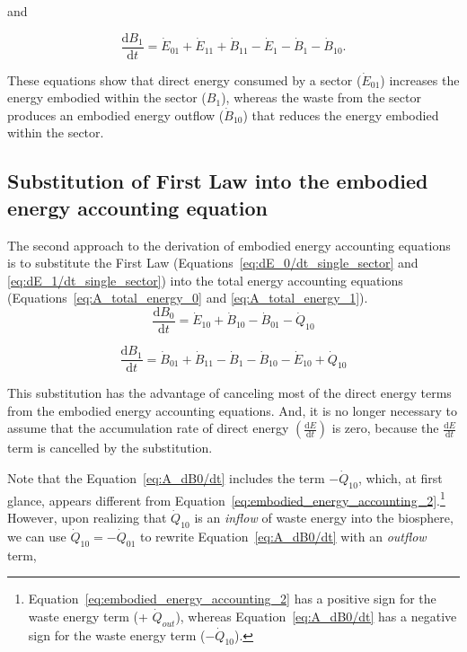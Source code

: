 \noindent and

\begin{equation} \label{eq:A_total_energy_1_simp}
	\frac{\mathrm{d}B_{1}}{\mathrm{d}t} 
	= \dot{E}_{01} 
	+ \dot{E}_{11}
	+ \dot{B}_{11}
	- \dot{E}_{1}
	- \dot{B}_{1}
	- \dot{B}_{10}.	
\end{equation}

These equations show that direct energy consumed by a 
sector ($\dot{E}_{01}$) increases the energy embodied within the sector ($B_1$), 
whereas the waste from the sector produces an embodied
energy outflow ($\dot{B}_{10}$) that reduces 
the energy embodied within the sector. 



\subsection{Substitution of First Law into the embodied energy accounting equation} %
\label{subsec:A_first_law_embodied}

The second approach to the derivation of embodied energy
accounting equations is to substitute the First Law
(Equations~\ref{eq:dE_0/dt_single_sector} and \ref{eq:dE_1/dt_single_sector}) 
into the total energy accounting equations 
(Equations~\ref{eq:A_total_energy_0} and \ref{eq:A_total_energy_1}). 
\begin{equation} \label{eq:A_dB0/dt}
	\frac{\mathrm{d}B_{0}}{\mathrm{d}t} 
	= \dot{E}_{10}
	+ \dot{B}_{10} 
	- \dot{B}_{01}
	- \dot{Q}_{10}
\end{equation}

\begin{equation} \label{eq:A_dB1/dt}
	\frac{\mathrm{d}B_{1}}{\mathrm{d}t} 
	= \dot{B}_{01} 
	+ \dot{B}_{11}
	- \dot{B}_{1}
	- \dot{B}_{10}
	- \dot{E}_{10}
	+ \dot{Q}_{10}
\end{equation}

This substitution has the advantage of canceling most 
of the direct energy terms from the embodied energy accounting equations.
And, it is no longer necessary to assume that the 
accumulation rate of direct energy 
$\left( \frac{\mathrm{d}E}{\mathrm{d}t} \right)$
is zero, because the 
$\frac{\mathrm{d}E}{\mathrm{d}t}$
term is cancelled by the substitution.

Note that the Equation~\ref{eq:A_dB0/dt} includes the
term $-\dot{Q}_{10}$, which, at first glance,
appears different from 
Equation~\ref{eq:embodied_energy_accounting_2}.\footnote{Equation~\ref{eq:embodied_energy_accounting_2}
has a positive sign for the waste energy term (+ $\dot{Q}_{out}$),
whereas Equation~\ref{eq:A_dB0/dt} has a 
negative sign for the waste energy term ($- \dot{Q}_{10}$).}
However, upon realizing that $\dot{Q}_{10}$ is an \emph{inflow}
of waste energy into the biosphere, we can use $\dot{Q}_{10} = - \dot{Q}_{01}$
to rewrite Equation~\ref{eq:A_dB0/dt} with an \emph{outflow} 
term,

